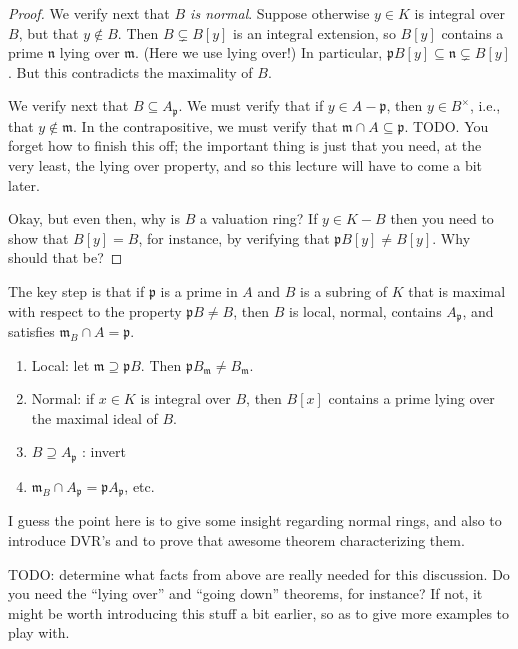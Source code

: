 \documentclass[reqno]{amsart}
\begin{document}
\begin{proof}
  We verify next that \emph{$B$ is normal}.
  Suppose otherwise $y \in K$ is integral over $B$,
  but that $y \notin B$.
  Then $B \subsetneq B[y]$ is an integral extension,
  so $B[y]$ contains a prime $\mathfrak{n}$ lying over
  $\mathfrak{m}$.
  (Here we use lying over!)
  In particular, $\mathfrak{p} B[y] \subseteq \mathfrak{n} \subsetneq B[y]$.
  But this contradicts the maximality of $B$.

  We verify next that $B \subseteq A_\mathfrak{p}$.
  We must verify that if $y \in A - \mathfrak{p}$,
  then $y \in B^\times$,
  i.e., that $y \notin \mathfrak{m}$.
  In the contrapositive,
  we must verify that
  $\mathfrak{m} \cap A \subseteq \mathfrak{p}$.
  TODO.  You forget how to finish this off; the important thing is just that
  you need, at the very least, the lying over property, and so this lecture
  will have to come a bit later.

  Okay, but even then, why is $B$ a valuation ring?
  If $y \in K - B$
  then you need to show that $B[y] = B$,
  for instance, by verifying that
  $\mathfrak{p} B[y] \neq B[y]$.
  Why should that be?
\end{proof}
The key step is that if \(\mathfrak{p}\) is a prime in \(A\) and \(B\)
is a subring of \(K\) that is maximal with respect to the property
\(\mathfrak{p} B \neq B\), then \(B\) is local, normal, contains
\(A_\mathfrak{p}\), and satisfies
\(\mathfrak{m}_B \cap A = \mathfrak{p}\).

\begin{enumerate}
\item Local: let $\mathfrak{m} \supseteq \mathfrak{p} B$.
  Then $\mathfrak{p} B_\mathfrak{m} \neq B_\mathfrak{m}$.
\item
  Normal: if $x \in K$ is integral over $B$, then $B[x]$
  contains a prime lying over the maximal ideal of $B$.
\item $B \supseteq A_\mathfrak{p}$ : invert
\item
  $\mathfrak{m}_B \cap A_\mathfrak{p} = \mathfrak{p}
  A_\mathfrak{p}$, etc.
\end{enumerate}
I guess the point here is to give some insight regarding normal rings, and also
to introduce DVR's and to prove that awesome theorem
characterizing them.

TODO: determine what facts from above are really needed
for this discussion.
Do you need the ``lying over'' and ``going down'' theorems,
for instance?
If not, it might be worth introducing
this stuff a bit earlier,
so as to give more examples to play with.
\end{document}
